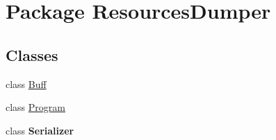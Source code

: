 \hypertarget{namespace_resources_dumper}{\section{Package Resources\-Dumper}
\label{namespace_resources_dumper}
}
\subsection*{Classes}
\begin{DoxyCompactItemize}
\item 
class \hyperlink{class_resources_dumper_1_1_buff}{Buff}
\item 
class \hyperlink{class_resources_dumper_1_1_program}{Program}
\item 
class {\bfseries Serializer}
\end{DoxyCompactItemize}
